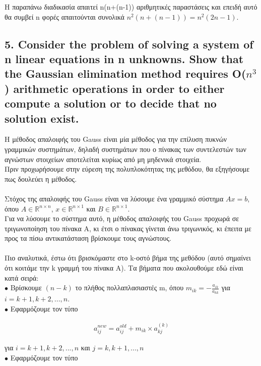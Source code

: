 \documentclass[12pt]{article}
\newcommand{\R}{\mathbb{R}}
\newcommand{\centered}[1]{\begin{align*}#1\end{align*}}
\begin{document}
Η παραπάνω διαδικασία απαιτεί n(n+(n-1)) αριθμητικές παραστάσεις και επειδή αυτό θα συμβεί n φορές απαιτούνται συνολικά $n^2(n+(n-1)) = n^2(2n-1)$.

\vspace{2in}

\pagebreak

\subsection*{5. Consider the problem of solving a system of n linear equations in n unknowns. Show
that the Gaussian elimination method requires O($n^3$) arithmetic operations in order to either
compute a solution or to decide that no solution exist.}

Η μέθοδος απαλοιφής του Gauss είναι μία μέθοδος για την επίλυση πυκνών γραμμικών συστημάτων, δηλαδή συστημάτων που ο πίνακας των συντελεστών των αγνώστων στοιχείων αποτελείται κυρίως από μη μηδενικά στοιχεία. \\

Πριν προχωρήσουμε στην εύρεση της πολυπλοκότητας της μεθόδου, θα εξηγήσουμε πως δουλεύει η μέθοδος. \\ \\
Στόχος της απαλοιφής του Gauss είναι να λύσουμε ένα γραμμικό σύστημα $Ax = b$, όπου $A \in \R^{n\times n}$, $x\in \R^{n\times 1}$ και $B\in \R^{n\times 1}$. \\

Για να λύσουμε το σύστημα αυτό, η μέθοδος απαλοιφής του Gauss προχωρά σε τριγωνοποίηση του πίνακα A, κι έτσι ο πίνακας γίνεται άνω τριγωνικός, κι έπειτα με προς τα πίσω αντικατάσταση βρίσκουμε τους αγνώστους. \\ \\
Πιο αναλυτικά, έστω ότι βρισκόμαστε στο k-οστό βήμα της μεθόδου (αυτό σημαίνει ότι κοιτάμε την k γραμμή του πίνακα A). Τα βήματα που ακολουθούμε εδώ είναι κατά σειρά: \\

$\bullet$ Βρίσκουμε $(n-k)$ το πλήθος πολλαπλασιαστές m, όπου $m_{ik} = - \frac{a_{ik}}{a_{kk}}$ για $i=k+1,k+2,...,n$. \\

$\bullet$ Εφαρμόζουμε τον τύπο

\centered{a_{ij}^{new} = a_{ij}^{old} + m_{ik}\times a_{kj}^{(k)}}

για $i = k+1, k+2, ...,n$ και $j = k, k+1,...,n$ \\

$\bullet$ Εφαρμόζουμε τον τύπο
\end{document}
